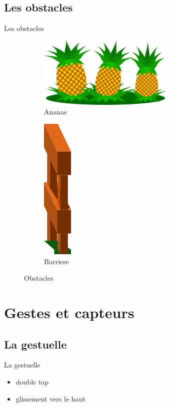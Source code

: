 \documentclass[t,12pt]{beamer}
\begin{document}
\subsection{Les obstacles}
\begin{frame}{Les obstacles}
    \begin{figure}
     \centering
     \begin{subfigure}[b]{0.3\textwidth}
         \centering
         \includegraphics[scale=0.5]{ananas}
         \caption{Ananas}
         \label{fig:Ananas}
     \end{subfigure}
     \hfill
     \begin{subfigure}[b]{0.1\textwidth}
         \centering
         \includegraphics[scale=0.5]{barriere}
         \caption{Barriere}
         \label{fig:Barriere}
     \end{subfigure}
     \caption{Obstacles}
     \label{fig:obstacles}
    \end{figure}
\end{frame}

\section{Gestes et capteurs}
\subsection{La gestuelle}
\begin{frame}{La gestuelle}
    \begin{itemize}
        \item double tap
        \item glissement vers le haut
    \end{itemize}
\end{frame}
\end{document}
